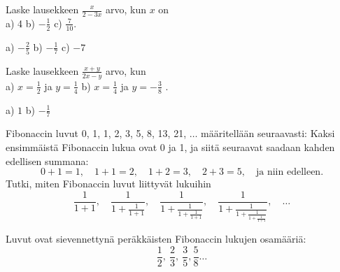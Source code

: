 \begin{tehtava}
Laske lausekkeen $\frac{x}{2-3x}$ arvo, kun $x$ on \\ a) 4 \qquad b) $-\frac{1}{2}$ \qquad c) $\frac{7}{10}$.
\begin{vastaus}
a) $-\frac{2}{5}$ \qquad b) $-\frac{1}{7}$ \qquad c) $-7$
\end{vastaus}
\end{tehtava}

\begin{tehtava}
Laske lausekkeen $\frac{x+y}{2x-y}$ arvo, kun \\ a) $x=\frac{1}{2}$ ja $y= \frac{1}{4}$ \qquad b) $x=\frac{1}{4}$ ja $y= -\frac{3}{8}$ \qquad.
\begin{vastaus}
a) $1$ \qquad b) $-\frac{1}{7}$
\end{vastaus}
\end{tehtava}

\begin{tehtava}
Fibonaccin luvut 0, 1, 1, 2, 3, 5, 8, 13, 21, $\ldots$ määritellään seuraavasti: Kaksi ensimmäistä
Fibonaccin lukua ovat 0 ja 1, ja siitä seuraavat saadaan kahden
edellisen summana: 
\[ 0+1=1, \quad 1+1=2, \quad 1+2 = 3, \quad 2+3=5, \quad 
\textrm{ja niin edelleen.} \]
Tutki, miten Fibonaccin luvut liittyvät lukuihin
\[ \frac{1}{1+1}, \quad \frac{1}{1+\frac{1}{1+1}}, \quad
\frac{1}{1+\frac{1}{1+\frac{1}{1+1}}}, \quad 
\frac{1}{1+\frac{1}{1+\frac{1}{1+\frac{1}{1+1}}}}, \quad \ldots\]
\begin{vastaus}
Luvut ovat sievennettynä peräkkäisten Fibonaccin
lukujen osamääriä:
\[\frac{1}{2}, \ \frac{2}{3}, \ \frac{3}{5}, \frac{5}{8} \ldots  \]
\end{vastaus}
\end{tehtava}